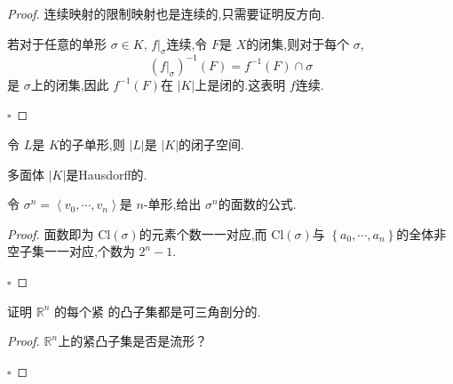 \documentclass[../../几何与拓扑.tex]{subfiles}
\begin{document}
\begin{proof}
    连续映射的限制映射也是连续的,只需要证明反方向.

    若对于任意的单形 \(   \sigma \in K  \), \(  f|_{ \sigma }  \)连续,令 \(  F  \)是 \(  X  \)的闭集,则对于每个 \(   \sigma   \), \[
    \left( f|_{ \sigma } \right)^{-1}  \left( F \right) =  f^{-1} \left( F \right)\cap  \sigma    
    \]     是 \(   \sigma   \)上的闭集,因此 \(  f^{-1} \left( F \right)   \)在 \(  \left| K \right|   \)上是闭的.这表明 \(  f  \)连续.    

    \hfill $\square$
\end{proof}

\begin{proposition}
    令 \(  L  \)是 \(  K  \)的子单形,则 \(  \left| L \right|   \)是 \(  \left| K \right|   \)的闭子空间.    
\end{proposition}

\begin{theorem}
    多面体 \(  \left| K \right|   \)是Hausdorff的. 
\end{theorem}



\begin{problemset}
    \item 令 \(   \sigma ^{n} =  \left< v_0,\cdots,v_{n}    \right>  \)是 \(  n  \)-单形,给出 \(   \sigma ^{n}  \)的面数的公式.   
    \begin{proof}
        面数即为 \(  \mathrm{Cl}\left(  \sigma  \right)   \)的元素个数一一对应,而 \(  \mathrm{Cl}\left(  \sigma  \right)   \)与 \(  \left\{  a_0,\cdots,a_{n}    \right\}  \)的全体非空子集一一对应,个数为 \(  2^{n}-1  \).    
    
        \hfill $\square$
    \end{proof}

     \item 证明 \(  \mathbb{R} ^{n}  \) 的每个紧 的凸子集都是可三角剖分的.
    \begin{proof}
       
        \(  \mathbb{R} ^{n}  \)上的紧凸子集是否是流形？ 
    
        \hfill $\square$
    \end{proof}
\end{problemset}
\end{document}
